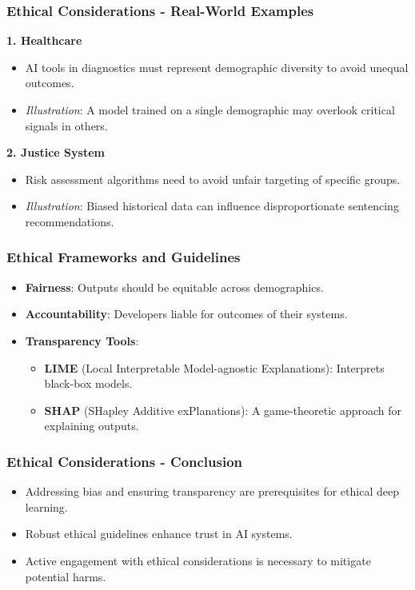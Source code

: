 \documentclass[aspectratio=169]{beamer}
\begin{document}
\begin{frame}[fragile]
    \frametitle{Ethical Considerations - Real-World Examples}
    \textbf{1. Healthcare}
    \begin{itemize}
        \item AI tools in diagnostics must represent demographic diversity to avoid unequal outcomes.
        \item \textit{Illustration}: A model trained on a single demographic may overlook critical signals in others.
    \end{itemize}
    
    \textbf{2. Justice System}
    \begin{itemize}
        \item Risk assessment algorithms need to avoid unfair targeting of specific groups.
        \item \textit{Illustration}: Biased historical data can influence disproportionate sentencing recommendations.
    \end{itemize}
\end{frame}

\begin{frame}[fragile]
    \frametitle{Ethical Frameworks and Guidelines}
    \begin{itemize}
        \item \textbf{Fairness}: Outputs should be equitable across demographics.
        \item \textbf{Accountability}: Developers liable for outcomes of their systems.
        \item \textbf{Transparency Tools}:
        \begin{itemize}
            \item \textbf{LIME} (Local Interpretable Model-agnostic Explanations): Interprets black-box models.
            \item \textbf{SHAP} (SHapley Additive exPlanations): A game-theoretic approach for explaining outputs.
        \end{itemize}
    \end{itemize}
\end{frame}

\begin{frame}[fragile]
    \frametitle{Ethical Considerations - Conclusion}
    \begin{itemize}
        \item Addressing bias and ensuring transparency are prerequisites for ethical deep learning.
        \item Robust ethical guidelines enhance trust in AI systems.
        \item Active engagement with ethical considerations is necessary to mitigate potential harms.
    \end{itemize}
\end{frame}
\end{document}
